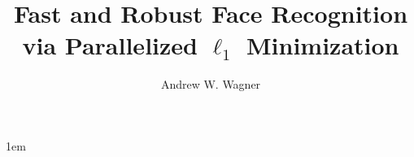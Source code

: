 \documentclass[draftthesis,tocnosub,noragright,centerchapter,12pt]{uiucecethesis09}
\title{Fast and Robust Face Recognition \\
		via Parallelized $\ell_1$ Minimization}
\author{Andrew W. Wagner}
\begin{document}

\maketitle

\parindent 1em%

\frontmatter

\begin{abstract}
 
\end{abstract}


%

\tableofcontents





\mainmatter









\appendix 


\backmatter



\end{document}
